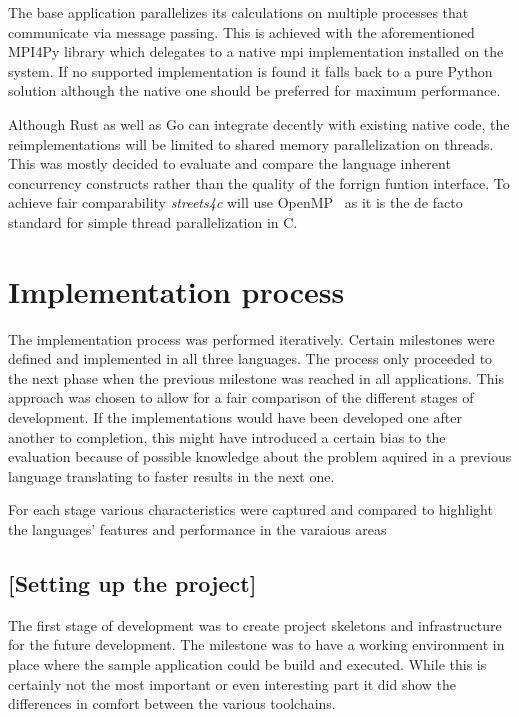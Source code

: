 The base application parallelizes its calculations on multiple processes that communicate via message passing. This is achieved with the aforementioned MPI4Py library which delegates to a native \gls{mpi} implementation installed on the system. If no supported implementation is found it falls back to a pure Python solution although the native one should be preferred for maximum performance.

Although Rust as well as Go can integrate decently with existing native code, the reimplementations will be limited to shared memory parallelization on threads. This was mostly decided to evaluate and compare the language inherent concurrency constructs rather than the quality of the forrign funtion interface. To achieve fair comparability \textit{streets4c} will use OpenMP~ as it is the de facto standard for simple thread parallelization in C.

\section{Implementation process}
\label{sec:Approach::Implementation}

The implementation process was performed iteratively. Certain milestones were defined and implemented in all three languages. The process only proceeded to the next phase when the previous milestone was reached in all applications. This approach was chosen to allow for a fair comparison of the different stages of development. If the implementations would have been developed one after another to completion, this might have introduced a certain bias to the evaluation because of possible knowledge about the problem aquired in a previous language translating to faster results in the next one.

For each stage various characteristics were captured and compared to highlight the languages' features and performance in the varaious areas

\setcounter{subsection}{-1}

\subsection{[Setting up the project]}
\label{subsec:Approach::Implementation::Setup}

The first stage of development was to create project skeletons and infrastructure for the future development. The milestone was to have a working environment in place where the sample application could be build and executed. While this is certainly not the most important or even interesting part it did show the differences in comfort between the various toolchains.

